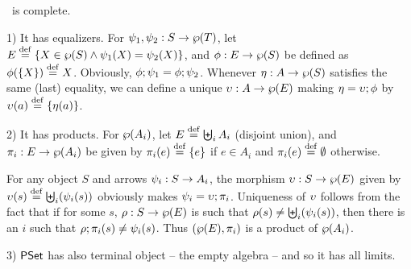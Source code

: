 \documentclass[10pt]{article}
\begin{document}
\begin{Fact}
\label{le:PStcompl}
\PSt\ is complete.
\end{Fact}

\begin{Proof}
1) It has equalizers. For $\psi_1,\psi_2:S\rightarrow\wp(T)$, let $E\stackrel{{\rm \tiny{def}}}=
\{X\in\wp(S)\land\psi_1(X)=\psi_2(X)\}$, and $\phi:E\rightarrow\wp(S)$
be defined as $\phi(\{X\})\stackrel{{\rm \tiny{def}}}= X$. Obviously,
$\phi;\psi_1=\phi;\psi_2$. Whenever $\eta:A\rightarrow\wp(S)$
satisfies the same (last) equality, we can define a unique
$\upsilon:A\rightarrow\wp(E)$ making $\eta=\upsilon;\phi$ by
$\upsilon(a)\stackrel{{\rm \tiny{def}}}=\{\eta(a)\}$.

2) It has products. For $\wp(A_i)$, let $E\stackrel{{\rm \tiny{def}}}= \biguplus_i A_i$
(disjoint union), and $\pi_i:E\rightarrow\wp(A_i)$ be given by
$\pi_i(e)\stackrel{{\rm \tiny{def}}}=\{e\}$ if $e\in A_i$ and $\pi_i(e)\stackrel{{\rm \tiny{def}}}=\emptyset$
otherwise.

For any object $S$ and arrows $\psi_i:S\rightarrow A_i$, the morphism
$\upsilon:S\rightarrow\wp(E)$ given by $\upsilon(s) \stackrel{{\rm \tiny{def}}}= \biguplus_i(\psi_i(s))$
obviously makes $\psi_i=\upsilon;\pi_i$. Uniqueness of $\upsilon$
follows from the fact that if for some $s$, $\rho:S\rightarrow\wp(E)$ is
such that $\rho(s)\not=\biguplus_i(\psi_i(s))$, then there is an $i$
such that $\rho;\pi_i(s)\not =\psi_i(s)$. Thus
$(\wp(E),\pi_i)$ is a product of $\wp(A_i)$.

3) $\mbox{\rm\sf PSet}$ has also terminal object -- the empty algebra -- and so it
has all limits.
\end{Proof}

\end{document}
